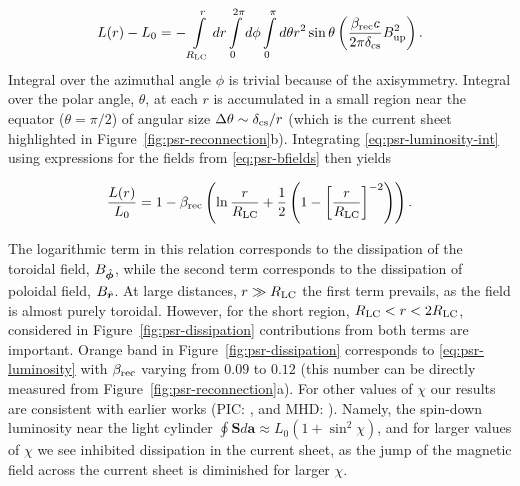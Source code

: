 \begin{equation}
\label{eq:psr-luminosity-int}
    L(r) - L_0 = -\int\limits_{R_{\rm LC}}^r dr\int\limits_0^{2\pi}d\phi \int\limits_0^\pi d\theta r^2\sin{\theta} \left(\frac{\beta_{\rm rec} c}{2\pi \delta_{\rm cs}}B_{\rm up}^2\right).
\end{equation}
\noindent Integral over the azimuthal angle $\phi$ is trivial because of the axisymmetry. Integral over the polar angle, $\theta$, at each $r$ is accumulated in a small region near the equator ($\theta=\pi/2$) of angular size $\Delta \theta\sim \delta_{\rm cs}/r$ (which is the current sheet highlighted in Figure~\ref{fig:psr-reconnection}b). Integrating \eqref{eq:psr-luminosity-int} using expressions for the fields from \eqref{eq:psr-bfields} then yields

\begin{equation}
\label{eq:psr-luminosity}
    \frac{L(r)}{L_0} = 1 - \beta_{\rm rec}\left(\ln{\frac{r}{R_{\rm LC}}}
    +\frac{1}{2}\left(1 -\left[\frac{r}{R_{\rm LC}}\right]^{-2}\right)\right).
\end{equation}

\noindent The logarithmic term in this relation corresponds to the dissipation of the toroidal field, $B_{\hat{\bm{\phi}}}$, while the second term corresponds to the dissipation of poloidal field, $B_{{\hat{\bm{r}}}}$. At large distances, $r\gg R_{\rm LC}$ the first term prevails, as the field is almost purely toroidal. However, for the short region, $R_{\rm LC}<r<2R_{\rm LC}$, considered in Figure~\ref{fig:psr-dissipation} contributions from both terms are important. Orange band in Figure~\ref{fig:psr-dissipation} corresponds to \eqref{eq:psr-luminosity} with $\beta_{\rm rec}$ varying from $0.09$ to $0.12$ (this number can be directly measured from Figure~\ref{fig:psr-reconnection}a). For other values of $\chi$ our results are consistent with earlier works (PIC: \citealt{2015ApJ...801L..19P}, and MHD: \citealt{2013MNRAS.435L...1T}). Namely, the spin-down luminosity near the light cylinder $\oint \bm{S}d\bm{a}\approx L_0(1 + \sin^2{\chi})$, and for larger values of $\chi$ we see inhibited dissipation in the current sheet, as the jump of the magnetic field across the current sheet is diminished for larger $\chi$.

